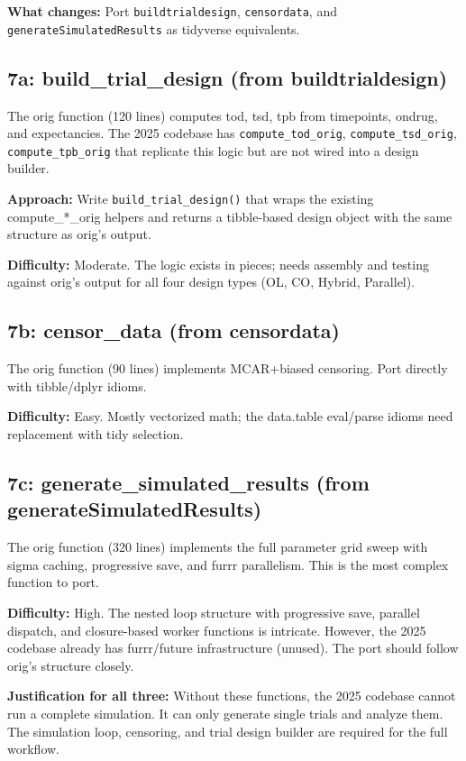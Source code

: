 \documentclass[11pt]{article}
\begin{document}
\textbf{What changes:} Port \texttt{buildtrialdesign}, \texttt{censordata}, and
\texttt{generateSimulatedResults} as tidyverse equivalents.

\subsection{7a: build\_trial\_design (from buildtrialdesign)}

The orig function (120 lines) computes tod, tsd, tpb from
timepoints, ondrug, and expectancies. The 2025 codebase has
\texttt{compute\_tod\_orig}, \texttt{compute\_tsd\_orig}, \texttt{compute\_tpb\_orig} that
replicate this logic but are not wired into a design builder.

\textbf{Approach:} Write \texttt{build\_trial\_design()} that wraps the existing
compute\_*\_orig helpers and returns a tibble-based design object
with the same structure as orig's output.

\textbf{Difficulty:} Moderate. The logic exists in pieces; needs assembly
and testing against orig's output for all four design types
(OL, CO, Hybrid, Parallel).

\subsection{7b: censor\_data (from censordata)}

The orig function (90 lines) implements MCAR+biased censoring.
Port directly with tibble/dplyr idioms.

\textbf{Difficulty:} Easy. Mostly vectorized math; the data.table
eval/parse idioms need replacement with tidy selection.

\subsection{7c: generate\_simulated\_results (from generateSimulatedResults)}

The orig function (320 lines) implements the full parameter grid
sweep with sigma caching, progressive save, and furrr parallelism.
This is the most complex function to port.

\textbf{Difficulty:} High. The nested loop structure with progressive
save, parallel dispatch, and closure-based worker functions is
intricate. However, the 2025 codebase already has furrr/future
infrastructure (unused). The port should follow orig's structure
closely.

\textbf{Justification for all three:} Without these functions, the 2025
codebase cannot run a complete simulation. It can only generate
single trials and analyze them. The simulation loop, censoring,
and trial design builder are required for the full workflow.
\end{document}
